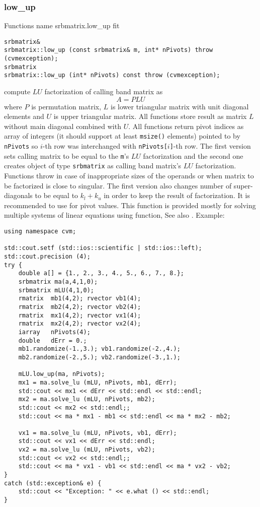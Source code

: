\subsubsection{low\_up}
Functions%
\pdfdest name {srbmatrix.low_up} fit
\begin{verbatim}
srbmatrix& 
srbmatrix::low_up (const srbmatrix& m, int* nPivots) throw (cvmexception);
srbmatrix
srbmatrix::low_up (int* nPivots) const throw (cvmexception);
\end{verbatim}
compute  $LU$ factorization of  calling band matrix as
\begin{equation*}
A=PLU
\end{equation*}
where $P$ is  permutation matrix, $L$ is  lower
triangular matrix with unit diagonal
elements and $U$ is  upper triangular matrix.
All  functions store  result as  matrix $L$ without
main diagonal combined with $U$. All  functions
return pivot indices as  array of integers
(it should support at least \verb"msize()" elements)
pointed to by \verb"nPivots" so \hbox{$i$-th} row
was interchanged with \hbox{\verb"nPivots["$i$\verb"]"-th} row.
The first version sets  calling matrix to be equal to the
\verb"m"'s $LU$ factorization and the second one
creates  object of type \verb"srbmatrix" as  calling band matrix's
$LU$ factorization.
Functions throw 
in case of inappropriate
sizes of the operands or when  matrix to be factorized is close to
singular. 
The first version also changes number of 
super-diagonals to be equal to $k_l+k_u$
in order to keep the result of factorization.
It is recommended to use 
for pivot values.
This function is provided mostly for solving multiple
systems of linear equations using 
 function,
See also
.
Example:
\begin{Verbatim}
using namespace cvm;

std::cout.setf (std::ios::scientific | std::ios::left); 
std::cout.precision (4);
try {
    double a[] = {1., 2., 3., 4., 5., 6., 7., 8.};
    srbmatrix ma(a,4,1,0);
    srbmatrix mLU(4,1,0);
    rmatrix  mb1(4,2); rvector vb1(4);
    rmatrix  mb2(4,2); rvector vb2(4);
    rmatrix  mx1(4,2); rvector vx1(4);
    rmatrix  mx2(4,2); rvector vx2(4);
    iarray   nPivots(4);
    double   dErr = 0.;
    mb1.randomize(-1.,3.); vb1.randomize(-2.,4.);
    mb2.randomize(-2.,5.); vb2.randomize(-3.,1.);

    mLU.low_up(ma, nPivots);
    mx1 = ma.solve_lu (mLU, nPivots, mb1, dErr);
    std::cout << mx1 << dErr << std::endl << std::endl;
    mx2 = ma.solve_lu (mLU, nPivots, mb2);
    std::cout << mx2 << std::endl;;
    std::cout << ma * mx1 - mb1 << std::endl << ma * mx2 - mb2;

    vx1 = ma.solve_lu (mLU, nPivots, vb1, dErr);
    std::cout << vx1 << dErr << std::endl;
    vx2 = ma.solve_lu (mLU, nPivots, vb2);
    std::cout << vx2 << std::endl;;
    std::cout << ma * vx1 - vb1 << std::endl << ma * vx2 - vb2;
}
catch (std::exception& e) {
    std::cout << "Exception: " << e.what () << std::endl;
}
\end{Verbatim}

